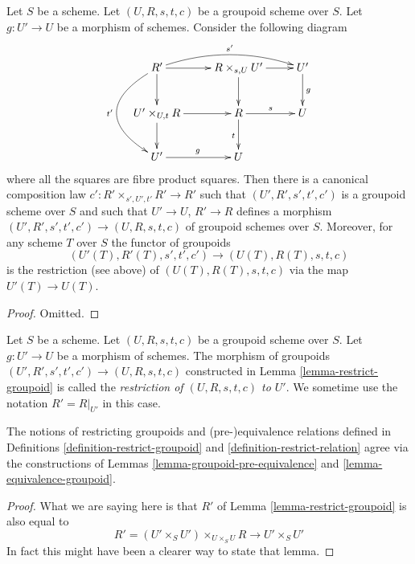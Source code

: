 \begin{lemma}
\label{lemma-restrict-groupoid}
Let $S$ be a scheme.
Let $(U, R, s, t, c)$ be a groupoid scheme over $S$.
Let $g : U' \to U$ be a morphism of schemes.
Consider the following diagram
$$
\xymatrix{
R' \ar[d] \ar[r] \ar@/_3pc/[dd]_{t'} \ar@/^1pc/[rr]^{s'}&
R \times_{s, U} U' \ar[r] \ar[d] &
U' \ar[d]^g \\
U' \times_{U, t} R \ar[d] \ar[r] &
R \ar[r]^s \ar[d]_t &
U \\
U' \ar[r]^g &
U
}
$$
where all the squares are fibre product squares. Then there is a
canonical composition law $c' : R' \times_{s', U', t'} R' \to R'$
such that $(U', R', s', t', c')$ is a groupoid scheme over
$S$ and such that $U' \to U$, $R' \to R$ defines a morphism
$(U', R', s', t', c') \to (U, R, s, t, c)$ of groupoid schemes over $S$.
Moreover, for any scheme $T$ over $S$ the functor of groupoids
$$
(U'(T), R'(T), s', t', c') \to (U(T), R(T), s, t, c)
$$
is the restriction (see above) of $(U(T), R(T), s, t, c)$ via the map
$U'(T) \to U(T)$.
\end{lemma}

\begin{proof}
Omitted.
\end{proof}

\begin{definition}
\label{definition-restrict-groupoid}
Let $S$ be a scheme.
Let $(U, R, s, t, c)$ be a groupoid scheme over $S$.
Let $g : U' \to U$ be a morphism of schemes.
The morphism of groupoids
$(U', R', s', t', c') \to (U, R, s, t, c)$
constructed in Lemma \ref{lemma-restrict-groupoid} is called
the {\it restriction of $(U, R, s, t, c)$ to $U'$}.
We sometime use the notation $R' = R|_{U'}$ in this case.
\end{definition}

\begin{lemma}
\label{lemma-restrict-groupoid-relation}
The notions of restricting groupoids and
(pre-)equivalence relations defined in Definitions
\ref{definition-restrict-groupoid} and \ref{definition-restrict-relation}
agree via the constructions of
Lemmas \ref{lemma-groupoid-pre-equivalence} and
\ref{lemma-equivalence-groupoid}.
\end{lemma}

\begin{proof}
What we are saying here is that $R'$ of
Lemma \ref{lemma-restrict-groupoid} is also
equal to
$$
R' = (U' \times_S U')\times_{U \times_S U} R
\longrightarrow
U' \times_S U'
$$
In fact this might have been a clearer way to state that lemma.
\end{proof}

